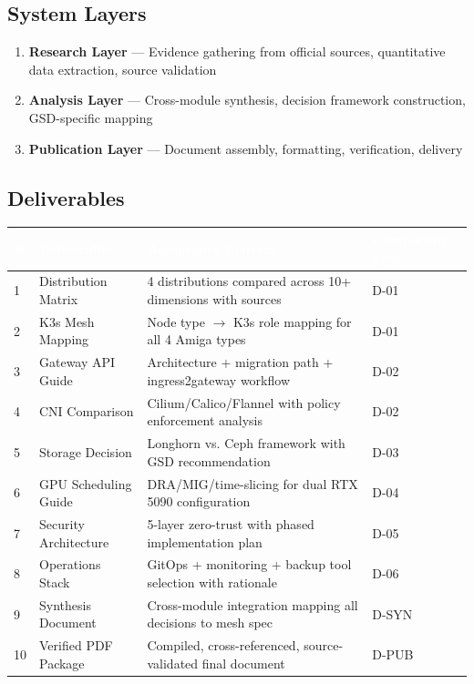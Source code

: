 \documentclass[11pt,letterpaper]{article}
\newcommand{\tableheader}[1]{\textbf{\sffamily\textcolor{white}{#1}}}
\begin{document}
\subsection{System Layers}

\begin{enumerate}[leftmargin=2em]
\item \textbf{Research Layer} --- Evidence gathering from official sources, quantitative data extraction, source validation
\item \textbf{Analysis Layer} --- Cross-module synthesis, decision framework construction, GSD-specific mapping
\item \textbf{Publication Layer} --- Document assembly, formatting, verification, delivery
\end{enumerate}

\subsection{Deliverables}

\begin{center}
\begin{tabularx}{\textwidth}{C{0.5cm}L{3cm}XL{2.5cm}}
\toprule
{}
\tableheader{\#} & \tableheader{Deliverable} & \tableheader{Acceptance Criteria} & \tableheader{Component Spec} \\
 & Distribution Matrix & 4 distributions compared across 10+ dimensions with sources & D-01 \\
2 & K3s Mesh Mapping & Node type $\rightarrow$ K3s role mapping for all 4 Amiga types & D-01 \\
3 & Gateway API Guide & Architecture + migration path + ingress2gateway workflow & D-02 \\
4 & CNI Comparison & Cilium/Calico/Flannel with policy enforcement analysis & D-02 \\
5 & Storage Decision & Longhorn vs. Ceph framework with GSD recommendation & D-03 \\
6 & GPU Scheduling Guide & DRA/MIG/time-slicing for dual RTX 5090 configuration & D-04 \\
7 & Security Architecture & 5-layer zero-trust with phased implementation plan & D-05 \\
8 & Operations Stack & GitOps + monitoring + backup tool selection with rationale & D-06 \\
9 & Synthesis Document & Cross-module integration mapping all decisions to mesh spec & D-SYN \\
10 & Verified PDF Package & Compiled, cross-referenced, source-validated final document & D-PUB \\
\bottomrule
\end{tabularx}
\end{center}
\end{document}
